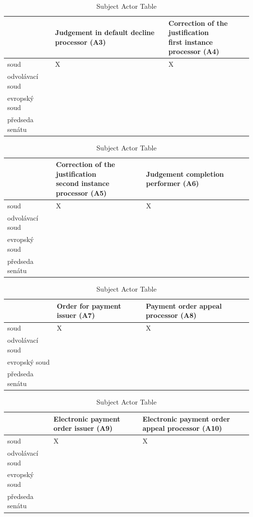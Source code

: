 \begin{landscape}
\begin{table}[h]
\caption{Subject Actor Table}
\label{tab:subjectactortable}
\begin{tabular}{|l|l|l|}
\hline
  & Judgement in default decline processor (A3)  &  \thead{Correction of the justification\\ first instance processor (A4)}   \\ \hline
soud & X & X  \\ \hline
odvolávací soud &  &   \\ \hline
evropský soud &  &  \\ \hline
předseda senátu &  &   \\ \hline
\end{tabular}
\end{table}

\begin{table}[h]
\caption{Subject Actor Table}
\label{tab:subjectactortable}
\begin{tabular}{|l|l|l|}
\hline
  &  \thead{Correction of the justification\\ second instance processor (A5)}  &  Judgement completion performer (A6)   \\ \hline
soud & X & X  \\ \hline
odvolávací soud &  &   \\ \hline
evropský soud &  &  \\ \hline
předseda senátu &  &  \\ \hline
\end{tabular}
\end{table}

\begin{table}[h]
\caption{Subject Actor Table}
\label{tab:subjectactortable}
\begin{tabular}{|l|l|l|}
\hline
  &  Order for payment issuer (A7)  &  Payment order appeal processor (A8)    \\ \hline
soud &  X & X \\ \hline
odvolávací soud &   &  \\ \hline
evropský soud &  &  \\ \hline
předseda senátu &  &  \\ \hline
\end{tabular}
\end{table}

\begin{table}[h]
\caption{Subject Actor Table}
\label{tab:subjectactortable}
\begin{tabular}{|l|l|l|}
\hline
  &  Electronic payment order issuer (A9)  &  Electronic payment order appeal processor (A10) \\ \hline
soud &  X & X   \\ \hline
odvolávací soud &  &  \\ \hline
evropský soud &  &  \\ \hline
předseda senátu & &   \\ \hline
\end{tabular}
\end{table}


\end{landscape}
